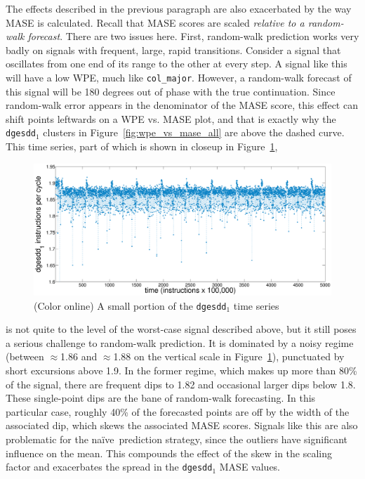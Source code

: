 \documentclass[%
pre,
reprint,
superscriptaddress,
showpacs,
nofootinbib,
nobibnotes,
 amsmath,amssymb,
 aps,
]{revtex4-1}
\newcommand{\svdone}{{\tt dgesdd}$_1$\xspace}
\newcommand{\naive}{na\"ive}
\begin{document}
The effects described in the previous paragraph are also exacerbated
by the way MASE is calculated.  Recall that MASE scores are scaled
\emph{relative to a random-walk forecast}.  There are two issues here.
First, random-walk prediction works very badly on signals with
frequent, large, rapid transitions.  Consider a signal that oscillates
from one end of its range to the other at every step.  A signal like
this will have a low WPE, much like {\tt col\_major}.  However, a
random-walk forecast of this signal will be 180 degrees out of phase
with the true continuation.  Since random-walk error appears in the
denominator of the MASE score, this effect can shift points leftwards
on a WPE vs. MASE plot, and that is exactly why the \svdone clusters
in Figure~\ref{fig:wpe_vs_mase_all} are above the dashed curve.  This
time series, part of which is shown in closeup in
Figure~\ref{fig:svdone-ts},
\begin{figure}[htbp]
  \centering
    \includegraphics[width=\columnwidth]{svdonets2}
\caption{(Color online) A small portion of the \svdone time series}\label{fig:svdone-ts}
\end{figure}
is not quite to the level of the worst-case signal described above,
but it still poses a serious challenge to random-walk prediction.  It
is dominated by a noisy regime (between $\approx$1.86 and
$\approx$1.88 on the vertical scale in Figure~\ref{fig:svdone-ts}),
punctuated by short excursions above 1.9.  In the former regime, which
makes up more than 80\% of the signal, there are frequent dips to 1.82
and occasional larger dips below 1.8.  These single-point dips are the
bane of random-walk forecasting.  In this particular case, roughly
40\% of the forecasted points are off by the width of the associated
dip, which skews the associated MASE scores.  Signals like this are
also problematic for the \naive ~prediction strategy, since the
outliers have significant influence on the mean.  This compounds the
effect of the skew in the scaling factor and exacerbates the spread in
the \svdone MASE values.
\end{document}
